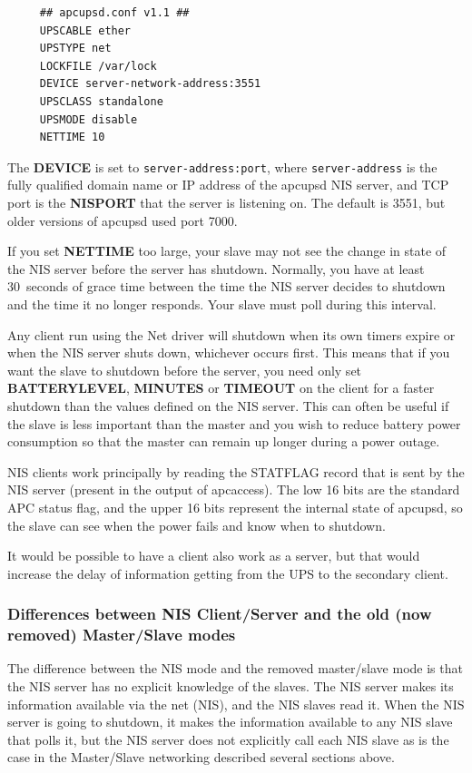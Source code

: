 \footnotesize
\begin{verbatim}
     ## apcupsd.conf v1.1 ##
     UPSCABLE ether
     UPSTYPE net
     LOCKFILE /var/lock
     DEVICE server-network-address:3551
     UPSCLASS standalone
     UPSMODE disable
     NETTIME 10
\end{verbatim}
\normalsize

The \textbf{DEVICE} is set to \texttt{server-address:port}, where
\texttt{server-address} is the fully qualified domain name or IP address of
the apcupsd NIS server, and TCP port is the \textbf{NISPORT} that the server
is listening on.  The default is 3551, but older versions of apcupsd used
port 7000.  

If you set \textbf{NETTIME} too large, your slave may not see the
change in state of the NIS server before the server has shutdown. Normally,
you have at least 30~seconds of grace time between the time the NIS server
decides to shutdown and the time it no longer responds. Your slave must poll
during this interval.  

Any client run using the Net driver will shutdown when its own timers
expire or when the NIS server shuts down, whichever occurs first. This
means that if you want the slave to shutdown before the server, you need
only set \textbf{BATTERYLEVEL}, \textbf{MINUTES} or \textbf{TIMEOUT} on
the client for a faster shutdown than the values defined on the NIS
server.  This can often be useful if the slave is less important than the
master and you wish to reduce battery power consumption so that the
master can remain up longer during a power outage. 

NIS clients work principally by reading the STATFLAG record that is sent
by the NIS server (present in the output of apcaccess). The low 16 bits
are the standard APC status flag, and the upper 16 bits represent the
internal state of apcupsd, so the slave can see when the power fails and
know when to shutdown.  

It would be possible to have a client also work as a server, but that would
increase the delay of information getting from the UPS to the secondary
client.

\subsubsection*{Differences between NIS Client/Server and the old 
(now removed) Master/Slave modes}

The difference between the NIS mode and the removed master/slave mode
is that the NIS server has no explicit knowledge of the slaves. The NIS
server makes its information available via the net (NIS), and the NIS
slaves read it.  When the NIS server is going to shutdown, it makes the
information available to any NIS slave that polls it, but the NIS server
does not explicitly call each NIS slave as is the case in the
Master/Slave networking described several sections above.  

